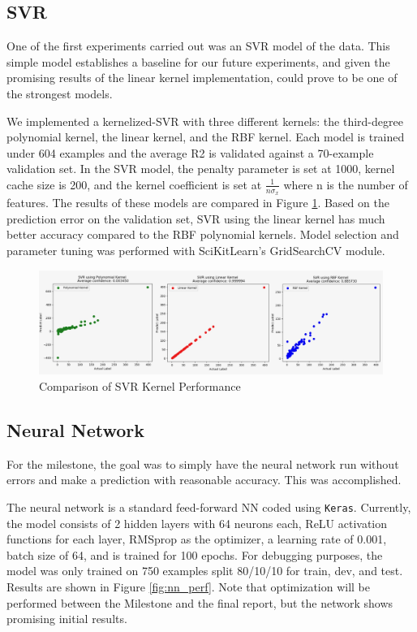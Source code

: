 \documentclass{article}
\begin{document}
	\subsection{SVR}
	One of the first experiments carried out was an SVR model of the data. This simple model establishes a baseline for our future experiments, and given the promising results of the linear kernel implementation, could prove to be one of the strongest models.
	
	We implemented a kernelized-SVR with three different kernels: the third-degree polynomial kernel, the linear kernel, and the RBF kernel. Each model is trained under 604 examples and the average R2 is validated against a 70-example validation set. In the SVR model, the penalty parameter is set at 1000, kernel cache size is 200, and the kernel coefficient  is set at $\frac{1}{n \sigma_x}$ where n is the number of features. The results of these models are compared in Figure \ref*{fig:svr_kern}. Based on the prediction error on the validation set, SVR using the linear kernel has much better accuracy compared to the RBF polynomial kernels. Model selection and parameter tuning was performed with SciKitLearn’s GridSearchCV module.
	
	
	\begin{figure}[H]
		\centering
		\includegraphics[scale=0.15]{"svr_kernels"}
		\caption{Comparison of SVR Kernel Performance}
		\label{fig:svr_kern}
	\end{figure}
	
	\subsection{Neural Network}
	
	For the milestone, the goal was to simply have the neural network run without errors and make a prediction with reasonable accuracy. This was accomplished. 
	
	The neural network is a standard feed-forward NN coded using \texttt{Keras}. Currently, the model consists of 2 hidden layers with 64 neurons each, ReLU activation functions for each layer, RMSprop as the optimizer, a learning rate of 0.001, batch size of 64, and is trained for 100 epochs. For debugging purposes, the model was only trained on 750 examples split 80/10/10 for train, dev, and test. Results are shown in Figure \ref*{fig:nn_perf}. Note that optimization will be performed between the Milestone and the final report, but the network shows promising initial results.
	
\end{document}

